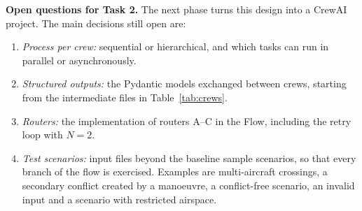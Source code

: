 \textbf{Open questions for Task 2.} The next phase turns this design into a CrewAI project. The main decisions still open are:
\begin{enumerate}
    \item \emph{Process per crew:} sequential or hierarchical, and which tasks can run in parallel or asynchronously.
    \item \emph{Structured outputs:} the Pydantic models exchanged between crews, starting from the intermediate files in Table~\ref{tab:crews}.
    \item \emph{Routers:} the implementation of routers A--C in the Flow, including the retry loop with $N = 2$.
    \item \emph{Test scenarios:} input files beyond the baseline sample scenarios, so that every branch of the flow is exercised. Examples are multi-aircraft crossings, a secondary conflict created by a manoeuvre, a conflict-free scenario, an invalid input and a scenario with restricted airspace.
\end{enumerate}
